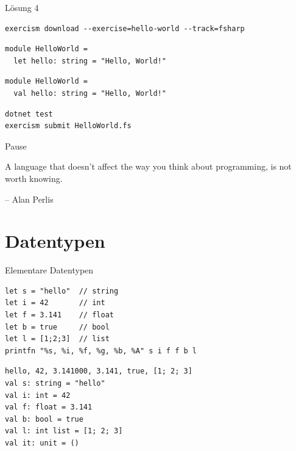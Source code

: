 \documentclass[t]{beamer}
\begin{document}
\begin{frame}[label={sec:org062bcc7},fragile]{Lösung 4}
 \scriptsize
\begin{verbatim}
exercism download --exercise=hello-world --track=fsharp
\end{verbatim}

\begin{verbatim}
module HelloWorld =
  let hello: string = "Hello, World!"
\end{verbatim}

\begin{verbatim}
module HelloWorld =
  val hello: string = "Hello, World!"
\end{verbatim}


\begin{verbatim}
dotnet test
exercism submit HelloWorld.fs
\end{verbatim}
\end{frame}

\begin{frame}[label={sec:org8ca7488}]{Pause}
\begin{block}{}
A language that doesn’t affect the way you think about programming, is not worth knowing.

\null\hfill-- Alan Perlis
\end{block}
\end{frame}


\section{Datentypen }
\label{sec:org843259c}

\begin{frame}[label={sec:orge7e2bf4},fragile]{Elementare Datentypen}
 \scriptsize
\begin{verbatim}
let s = "hello"  // string
let i = 42       // int
let f = 3.141    // float
let b = true     // bool
let l = [1;2;3]  // list
printfn "%s, %i, %f, %g, %b, %A" s i f f b l
\end{verbatim}

\begin{verbatim}
hello, 42, 3.141000, 3.141, true, [1; 2; 3]
val s: string = "hello"
val i: int = 42
val f: float = 3.141
val b: bool = true
val l: int list = [1; 2; 3]
val it: unit = ()
\end{verbatim}
\end{frame}
\end{document}
